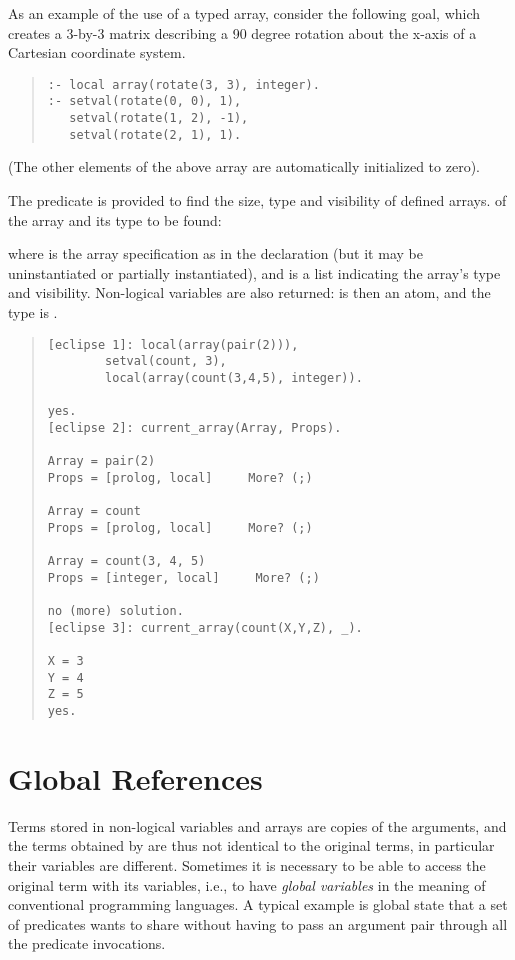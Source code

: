 As an example of the use of a typed array, consider the following goal, which
creates a 3-by-3 matrix describing a 90 degree rotation about the x-axis of
a Cartesian coordinate system.
\begin{quote}
\begin{verbatim}
:- local array(rotate(3, 3), integer).
:- setval(rotate(0, 0), 1),
   setval(rotate(1, 2), -1),
   setval(rotate(2, 1), 1).
\end{verbatim}
\end{quote}
(The other elements of the above array are automatically initialized to zero).

The predicate
is provided to find the size, type and visibility of defined arrays.
of the array and its type to be found:
\begin{quote}
\end{quote}
where  is the array specification as in the declaration (but it
may be uninstantiated or partially instantiated), and  is
a list indicating the array's type and visibility.
Non-logical variables are also returned:  is then an atom, and
the type is .
\begin{quote}
\begin{verbatim}
[eclipse 1]: local(array(pair(2))),
        setval(count, 3),
        local(array(count(3,4,5), integer)).

yes.
[eclipse 2]: current_array(Array, Props).

Array = pair(2)
Props = [prolog, local]     More? (;)

Array = count
Props = [prolog, local]     More? (;)

Array = count(3, 4, 5)
Props = [integer, local]     More? (;)

no (more) solution.
[eclipse 3]: current_array(count(X,Y,Z), _).

X = 3
Y = 4
Z = 5
yes.
\end{verbatim}
\end{quote}


\section{Global References}
\label{globrefs}
Terms stored in non-logical variables and arrays are copies of the
 arguments,
and the terms obtained by
 are thus not identical
to the original terms, in particular their variables are different.
Sometimes it is necessary to be able
to access the original term with its variables, i.e., to have
\emph{global variables} in the meaning of conventional programming
languages.
A typical example is global state that a set of predicates wants to
share without having to pass an argument pair through all the
predicate invocations.

